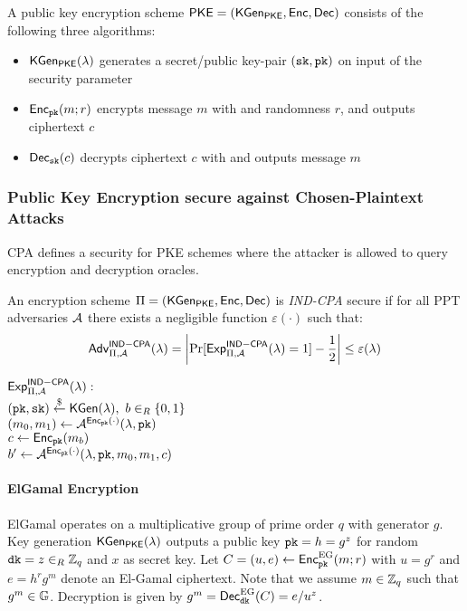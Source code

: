 \begin{definition}\label{def:pkencryption}
A public key encryption scheme $\mathsf{PKE}=(\mathsf{KGen_{PKE}}, \mathsf{Enc}, \mathsf{Dec})$ consists of the following three algorithms:
\begin{itemize}
  \item $\mathsf{KGen_{PKE}}(\lambda)$ generates a secret/public key-pair $(\mathtt{sk},\mathtt{pk})$ on input of the security parameter \secpar
  \item $\mathsf{Enc}_\mathtt{pk}(m; r)$ encrypts message $m$ with \pk and randomness $r$, and outputs ciphertext $c$
  \item $\mathsf{Dec}_\mathtt{sk}(c)$ decrypts ciphertext $c$ with \sk and outputs message $m$
\end{itemize}
\end{definition}


\subsubsection{Public Key Encryption secure against Chosen-Plaintext Attacks}
\ac{CPA} defines a security for \ac{PKE} schemes where the attacker is allowed to query encryption and decryption oracles.

\begin{definition}\label{def:indcpa}
An encryption scheme $\Pi=(\mathsf{KGen_{PKE}},\mathsf{Enc},\mathsf{Dec})$ is \emph{IND-CPA} secure if for all \ac{PPT} adversaries $\mathcal{A}$ there exists a negligible function $\varepsilon(\cdot)$ such that:
\[\mathsf{Adv}_{\Pi,\mathcal{A}}^{\mathsf{IND-CPA}}(\lambda)=\left|\Pr[\mathsf{Exp}^{\mathsf{IND-CPA}}_{\Pi,\mathcal{A}}(\lambda)=1]-\frac12\right|\leq\varepsilon(\lambda)\]

\noindent
$\mathsf{Exp}^{\mathsf{IND-CPA}}_{\Pi,\mathcal{A}}(\lambda):$\\
\hspace*{2em}$(\mathtt{pk},\mathtt{sk})\stackrel{\$}{\gets}\mathsf{KGen}(\lambda),~b\in_R\{0,1\}$\\
\hspace*{2em}$(m_0,m_1)\gets\mathcal{A}^{\mathsf{Enc}_\mathtt{pk}(\cdot)}(\lambda,\mathtt{pk})$\\
\hspace*{2em}$c\gets\mathsf{Enc}_\mathtt{pk}(m_b)$\\
\hspace*{2em}$b'\gets\mathcal{A}^{\mathsf{Enc}_\mathtt{pk}(\cdot)}(\lambda,\mathtt{pk},m_0,m_1,c)$\\
\eod
\end{definition}


\paragraph{ElGamal Encryption}\label{sec:elgamalencryption}
ElGamal operates on a multiplicative group \GG of prime order $q$ with generator $g$.
Key generation $\mathsf{KGen_{PKE}}(\lambda)$ outputs a public key $\mathtt{pk}=h=g^z$ for random $\mathtt{dk}=z\in_R\mathbb{Z}_q$ and $x$ as secret key.
Let $C=(u,e)\gets\mathsf{Enc}^{\mathrm{EG}}_\mathtt{pk}(m;r)$ with $u=g^r$ and $e=h^rg^m$ denote an El-Gamal ciphertext.
Note that we assume $m\in\mathbb{Z}_q$ such that $g^m\in\mathbb{G}$.
Decryption is given by $g^m=\mathsf{Dec}_\mathtt{dk}^\mathrm{EG}(C)=e/u^z$.


